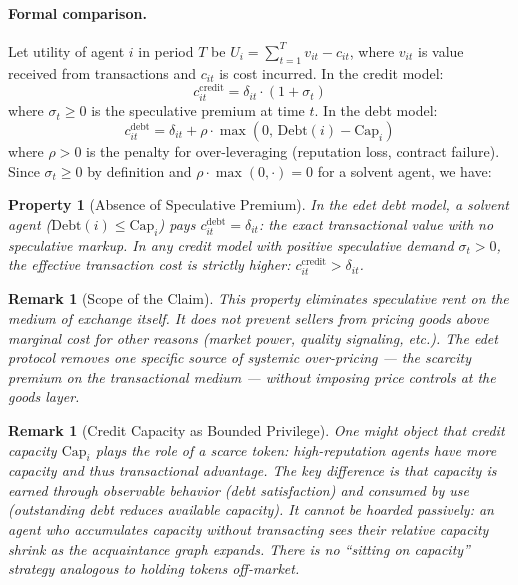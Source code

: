 \documentclass[11pt]{article}
\newtheorem{remark}[theorem]{Remark}
\newtheorem{property}{Property}[section]
\begin{document}
\paragraph{Formal comparison.}
Let utility of agent $i$ in period $T$ be $U_i = \sum_{t=1}^T v_{it} - c_{it}$, where $v_{it}$ is value received from transactions and $c_{it}$ is cost incurred. In the credit model:
\begin{equation}
    c^{\text{credit}}_{it} = \delta_{it} \cdot (1 + \sigma_t)
\end{equation}
where $\sigma_t \geq 0$ is the speculative premium at time $t$. In the debt model:
\begin{equation}
    c^{\text{debt}}_{it} = \delta_{it} + \rho \cdot \max(0,\, \text{Debt}(i) - \text{Cap}_i)
\end{equation}
where $\rho > 0$ is the penalty for over-leveraging (reputation loss, contract failure). Since $\sigma_t \geq 0$ by definition and $\rho \cdot \max(0, \cdot) = 0$ for a solvent agent, we have:

\begin{property}[Absence of Speculative Premium]
In the edet debt model, a solvent agent ($\text{Debt}(i) \leq \text{Cap}_i$) pays $c^{\text{debt}}_{it} = \delta_{it}$: the exact transactional value with no speculative markup. In any credit model with positive speculative demand $\sigma_t > 0$, the effective transaction cost is strictly higher: $c^{\text{credit}}_{it} > \delta_{it}$.
\end{property}

\begin{remark}[Scope of the Claim]
This property eliminates speculative rent on the \emph{medium of exchange itself}. It does not prevent sellers from pricing goods above marginal cost for other reasons (market power, quality signaling, etc.). The edet protocol removes one specific source of systemic over-pricing — the scarcity premium on the transactional medium — without imposing price controls at the goods layer.
\end{remark}

\begin{remark}[Credit Capacity as Bounded Privilege]
One might object that credit capacity $\text{Cap}_i$ plays the role of a scarce token: high-reputation agents have more capacity and thus transactional advantage. The key difference is that capacity is \emph{earned through observable behavior} (debt satisfaction) and \emph{consumed by use} (outstanding debt reduces available capacity). It cannot be hoarded passively: an agent who accumulates capacity without transacting sees their relative capacity shrink as the acquaintance graph expands. There is no ``sitting on capacity'' strategy analogous to holding tokens off-market.
\end{remark}
\end{document}

